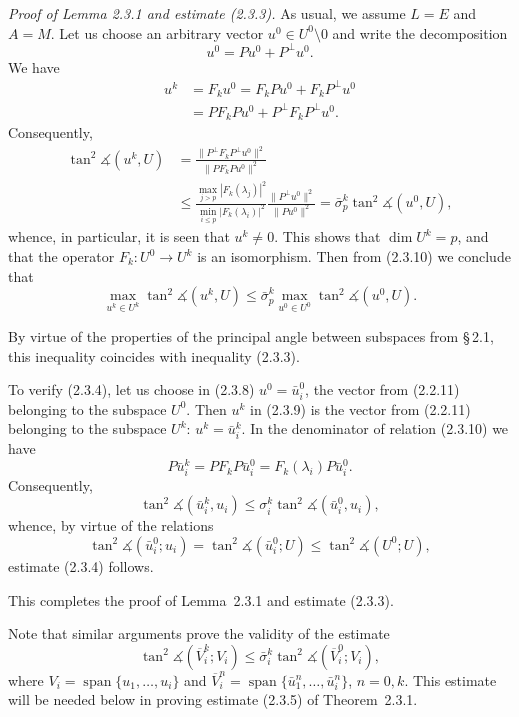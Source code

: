 \documentclass[11pt,oneside]{book}
\newcommand{\myspan}{\operatorname{span}}
\newcommand{\ang}{\measuredangle}
\begin{document}
\textit{Proof of Lemma 2.3.1 and estimate (2.3.3).} As usual, we assume $L = E$ and $A = M$. Let us choose an arbitrary vector $u^0 \in U^0 \setminus 0$ and write the decomposition
\[
u^0 = P u^0 + P^\perp u^0. \tag{2.3.8}
\]
We have
\[
\begin{aligned}
u^k &= F_k u^0 = F_k P u^0 + F_k P^\perp u^0 \\
&= P F_k P u^0 + P^\perp F_k P^\perp u^0.
\end{aligned}
\tag{2.3.9}
\]
Consequently,
\[
\begin{aligned}
\tan^2 \ang(u^k, U) &= \frac{\|P^\perp F_k P^\perp u^0\|^2}{\|P F_k P u^0\|^2} \\
&\leqslant \frac{\max\limits_{j > p} |F_k(\lambda_j)|^2}{\min\limits_{i \leqslant p} |F_k(\lambda_i)|^2} \frac{\|P^\perp u^0\|^2}{\|P u^0\|^2} = \bar{\sigma}_p^k \tan^2 \ang(u^0, U),
\end{aligned}
\tag{2.3.10}
\]
whence, in particular, it is seen that $u^k \neq 0$. This shows that $\dim U^k = p$, and that the operator $F_k : U^0 \to U^k$ is an isomorphism. Then from (2.3.10) we conclude that
\[
\max_{u^k \in U^k} \tan^2 \ang(u^k, U) \leqslant \bar{\sigma}_p^k \max_{u^0 \in U^0} \tan^2 \ang(u^0, U).
\]

By virtue of the properties of the principal angle between subspaces from \S\,2.1, this inequality coincides with inequality (2.3.3).

To verify (2.3.4), let us choose in (2.3.8) $u^0 = \bar{u}_i^0$, the vector from (2.2.11) belonging to the subspace $U^0$. Then $u^k$ in (2.3.9) is the vector from (2.2.11) belonging to the subspace $U^k$: $u^k = \bar{u}_i^k$. In the denominator of relation (2.3.10) we have
\[
P \bar{u}_i^k = P F_k P \bar{u}_i^0 = F_k(\lambda_i) P \bar{u}_i^0.
\]
Consequently,
\[
\tan^2 \ang(\bar{u}_i^k, u_i) \leqslant \sigma_i^k \tan^2 \ang(\bar{u}_i^0, u_i),
\]
whence, by virtue of the relations
\[
\tan^2 \ang(\bar{u}_i^0; u_i) = \tan^2 \ang(\bar{u}_i^0; U) \leqslant \tan^2 \ang(U^0; U),
\]
estimate (2.3.4) follows.

This completes the proof of Lemma~2.3.1 and estimate (2.3.3).

Note that similar arguments prove the validity of the estimate
\[
\tan^2 \ang(\overline{V}_i^k; V_i) \leqslant \bar{\sigma}_i^k \tan^2 \ang(\overline{V}_i^0; V_i), \tag{2.3.11}
\]
where $V_i = \myspan\{u_1, \ldots, u_i\}$ and $\overline{V}_i^n = \myspan\{\bar{u}_1^n, \ldots, \bar{u}_i^n\}$, $n = 0, k$. This estimate will be needed below in proving estimate (2.3.5) of Theorem~2.3.1.
\end{document}
